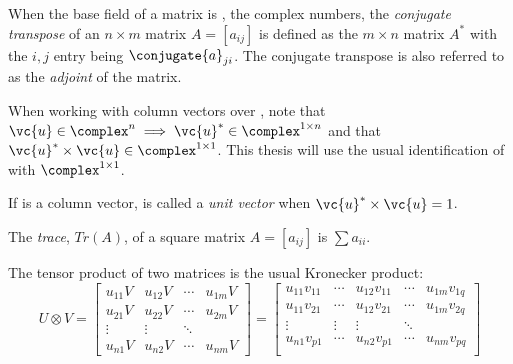 \begin{definition}\label{def:conjugate_transpose}
  When the base field of a matrix is \complex, the complex numbers, the \emph{conjugate transpose}
  of an $n\times m$ matrix $A=[a_{i j}]$ is defined as the $m\times
  n$ matrix $A^{*}$ with the $i,j$ entry being $\conjugate{a}_{j i}$. The conjugate transpose is
  also referred to as the \emph{adjoint} of the matrix.
\end{definition}

When working with column vectors over \complex, note that $\vc{u} \in \complex^n \implies
\vc{u}^{*} \in \complex^{1\times n}$ and that $\vc{u}^{*}\times \vc{u} \in \complex^{1\times 1}$.
This thesis will use the usual identification of \complex{} with $\complex^{1\times1}$.

\begin{definition}\label{def:unit_vector}
  If  is a \complex column vector,  is called a \emph{unit vector} when
  $\vc{u}^{*}\times \vc{u} = 1$.
\end{definition}

\begin{definition}\label{def:trace}
  The \emph{trace}, $Tr(A)$, of a square matrix $A=[a_{i j}]$ is $\sum a_{ii}$.
\end{definition}

The tensor product of two matrices is the usual Kronecker product:
  \[
    U\otimes V =
    \begin{bmatrix}
      u_{11}V&u_{12}V & \cdots &u_{1m}V\\
      u_{21}V&u_{22}V & \cdots &u_{2m}V \\
      \vdots&\vdots&\ddots\\
      u_{n1}V&u_{n2}V & \cdots &u_{n m}V
    \end{bmatrix}
    =
    \begin{bmatrix}
      u_{11}v_{11}&\cdots&u_{12}v_{11} & \cdots& u_{1m}v_{1q} \\
      u_{11}v_{21}&\cdots&u_{12}v_{21} & \cdots& u_{1m}v_{2q} \\
      \vdots&\vdots&\vdots&\ddots \\
      u_{n1}v_{p1}&\cdots&u_{n2}v_{p1} & \cdots& u_{n m}v_{p q} \\
    \end{bmatrix}
  \]

